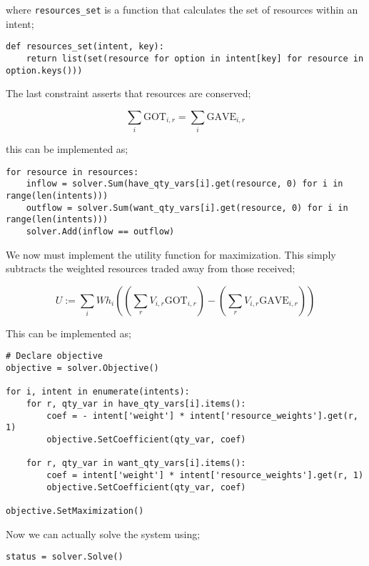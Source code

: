 where \verb|resources_set| is a function that calculates the set of resources within an intent;


\begin{verbatim}
def resources_set(intent, key):
    return list(set(resource for option in intent[key] for resource in option.keys()))
\end{verbatim}

The last constraint asserts that resources are conserved;

\begin{equation}
    \sum_{i} \text{GOT}_{i, r} = \sum_{i} \text{GAVE}_{i, r}
\end{equation}

this can be implemented as;

\begin{verbatim}
for resource in resources:
    inflow = solver.Sum(have_qty_vars[i].get(resource, 0) for i in range(len(intents)))
    outflow = solver.Sum(want_qty_vars[i].get(resource, 0) for i in range(len(intents)))
    solver.Add(inflow == outflow)
\end{verbatim}

We now must implement the utility function for maximization. This simply subtracts the weighted resources traded away from those received;

\begin{equation}
    U := \sum_i Wh_i \left(\left(\sum_r V_{i, r} \text{GOT}_{i, r}\right) - \left(\sum_r V_{i, r} \text{GAVE}_{i, r}\right)\right)
\end{equation}

This can be implemented as;

\begin{verbatim}
# Declare objective
objective = solver.Objective()

for i, intent in enumerate(intents):
    for r, qty_var in have_qty_vars[i].items():
        coef = - intent['weight'] * intent['resource_weights'].get(r, 1)
        objective.SetCoefficient(qty_var, coef)

    for r, qty_var in want_qty_vars[i].items():
        coef = intent['weight'] * intent['resource_weights'].get(r, 1)
        objective.SetCoefficient(qty_var, coef)

objective.SetMaximization()
\end{verbatim}

Now we can actually solve the system using;


\begin{verbatim}
status = solver.Solve()
\end{verbatim}

